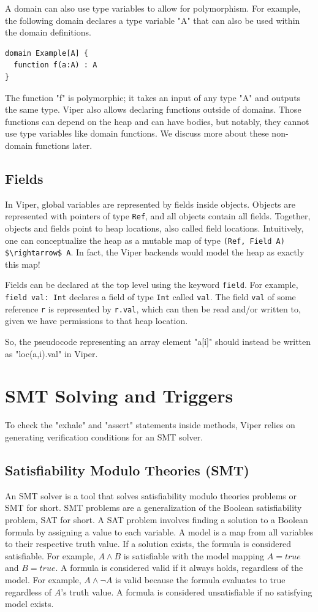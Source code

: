 \documentclass[msc,oneside]{ubcthesis}
\begin{document}
A domain can also use type variables to allow for polymorphism. For example, the following domain declares a type variable "A" that can also be used within the domain definitions.
\begin{lstlisting}
domain Example[A] {
  function f(a:A) : A
}
\end{lstlisting}
The function "f" is polymorphic; it takes an input of any type "A" and outputs the same type. Viper also allows declaring functions outside of domains. Those functions can depend on the heap and can have bodies, but notably, they cannot use type variables like domain functions. We discuss more about these non-domain functions later.

\subsection{Fields}
In Viper, global variables are represented by fields inside objects. Objects are represented with pointers of type \lstinline{Ref}, and all objects contain all fields. Together, objects and fields point to heap locations, also called field locations. Intuitively, one can conceptualize the heap as a mutable map of type \lstinline{(Ref, Field A) $\rightarrow$ A}. In fact, the Viper backends would model the heap as exactly this map!

Fields can be declared at the top level using the keyword \lstinline|field|. For example, \lstinline|field val: Int| declares a field of type \lstinline{Int} called \lstinline{val}. The field \lstinline|val| of some reference \lstinline|r| is represented by \lstinline|r.val|, which can then be read and/or written to, given we have permissions to that heap location.

So, the pseudocode representing an array element "a[i]" should instead be written as "loc(a,i).val" in Viper.

\section{SMT Solving and Triggers}
To check the "exhale" and "assert" statements inside methods, Viper relies on generating verification conditions for an SMT solver.

\subsection{Satisfiability Modulo Theories (SMT)}
An SMT solver is a tool that solves satisfiability modulo theories problems or SMT for short. SMT problems are a generalization of the Boolean satisfiability problem, SAT for short. A SAT problem involves finding a solution to a Boolean formula by assigning a value to each variable. A model is a map from all variables to their respective truth value. If a solution exists, the formula is considered satisfiable. For example, $A \land B$ is satisfiable with the model mapping $A = \textit{true}$ and $B = \textit{true}$. A formula is considered valid if it always holds, regardless of the model. For example, $A \land \neg A$ is valid because the formula evaluates to true regardless of $A$'s truth value. A formula is considered unsatisfiable if no satisfying model exists. 
\end{document}
